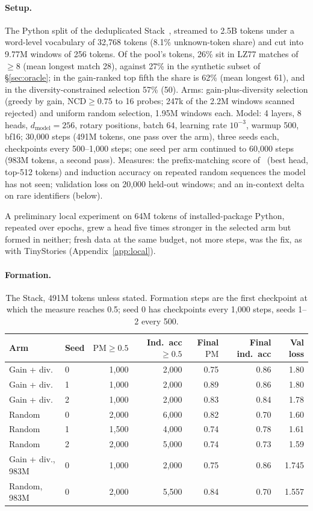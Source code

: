 \documentclass[11pt]{article}
\newcommand{\ncd}{\mathrm{NCD}}
\newcommand{\pms}{\mathrm{PM}}
\begin{document}
\paragraph{Setup.}
The Python split of the deduplicated Stack~\citep{kocetkov2022stack},
streamed to 2.5B tokens under a word-level vocabulary of 32,768 tokens
(8.1\% unknown-token share) and cut into 9.77M windows of 256 tokens.
Of the pool's tokens, 26\% sit in LZ77 matches of $\geq8$ (mean longest
match 28), against 27\% in the synthetic subset of \S\ref{sec:oracle}; in
the gain-ranked top fifth the share is 62\% (mean longest 61), and in the
diversity-constrained selection 57\% (50). Arms: gain-plus-diversity
selection (greedy by gain, $\ncd\geq0.75$ to 16 probes; 247k of the 2.2M
windows scanned rejected) and uniform random selection, 1.95M windows
each. Model: 4 layers, 8 heads, $d_{\mathrm{model}}=256$, rotary
positions, batch 64, learning rate $10^{-3}$, warmup 500, bf16; 30,000
steps (491M tokens, one pass over the arm), three seeds each, checkpoints
every 500--1,000 steps; one seed per arm continued to 60,000 steps (983M
tokens, a second pass). Measures: the prefix-matching score
of~\citet{olsson2022induction} (best head, top-512 tokens) and induction
accuracy on repeated random sequences the model has not seen; validation
loss on 20,000 held-out windows; and an in-context delta on rare
identifiers (below).

A preliminary local experiment on 64M tokens of installed-package Python,
repeated over epochs, grew a head five times stronger in the selected arm
but formed in neither; fresh data at the same budget, not more steps, was
the fix, as with TinyStories (Appendix~\ref{app:local}).

\paragraph{Formation.}
\begin{table}[t]\centering\small
\begin{tabular}{llrrrrr}\toprule
Arm & Seed & $\pms\geq0.5$ & Ind.\ acc $\geq0.5$ & Final $\pms$ & Final ind.\ acc & Val loss \\\midrule
Gain + div. & 0 & 1,000 & 2,000 & 0.75 & 0.86 & 1.80 \\
Gain + div. & 1 & 1,000 & 2,000 & 0.89 & 0.86 & 1.80 \\
Gain + div. & 2 & 1,000 & 2,000 & 0.83 & 0.84 & 1.78 \\
Random      & 0 & 2,000 & 6,000 & 0.82 & 0.70 & 1.60 \\
Random      & 1 & 1,500 & 4,000 & 0.74 & 0.78 & 1.61 \\
Random      & 2 & 2,000 & 5,000 & 0.74 & 0.73 & 1.59 \\\midrule
Gain + div., 983M & 0 & 1,000 & 2,000 & 0.75 & 0.86 & 1.745 \\
Random, 983M      & 0 & 2,000 & 5,500 & 0.84 & 0.70 & 1.557 \\\bottomrule
\end{tabular}
\caption{The Stack, 491M tokens unless stated. Formation steps are the
first checkpoint at which the measure reaches 0.5; seed 0 has checkpoints
every 1,000 steps, seeds 1--2 every 500.}
\label{tab:stack}
\end{table}
\end{document}
